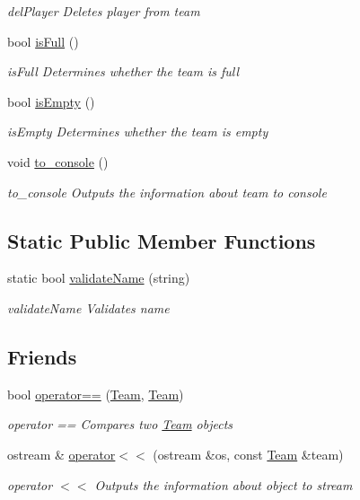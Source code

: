 \begin{DoxyCompactItemize}
\begin{DoxyCompactList}\small\item\em del\-Player Deletes player from team \end{DoxyCompactList}\item 
bool \hyperlink{class_team_a0692cba8304a16a9e7130199d98dc20e}{is\-Full} ()
\begin{DoxyCompactList}\small\item\em is\-Full Determines whether the team is full \end{DoxyCompactList}\item 
bool \hyperlink{class_team_a20b76437be05fcbe17b921cdc9972327}{is\-Empty} ()
\begin{DoxyCompactList}\small\item\em is\-Empty Determines whether the team is empty \end{DoxyCompactList}\item 
void \hyperlink{class_team_adb9b80fa6c6f6c0eed5f7500523d7860}{to\-\_\-console} ()
\begin{DoxyCompactList}\small\item\em to\-\_\-console Outputs the information about team to console \end{DoxyCompactList}\end{DoxyCompactItemize}
\subsection*{Static Public Member Functions}
\begin{DoxyCompactItemize}
\item 
static bool \hyperlink{class_team_a61e1d0f6f00634835b02168deb404ddd}{validate\-Name} (string)
\begin{DoxyCompactList}\small\item\em validate\-Name Validates name \end{DoxyCompactList}\end{DoxyCompactItemize}
\subsection*{Friends}
\begin{DoxyCompactItemize}
\item 
bool \hyperlink{class_team_a9eee662144e38bf78a062e006c8c3ceb}{operator==} (\hyperlink{class_team}{Team}, \hyperlink{class_team}{Team})
\begin{DoxyCompactList}\small\item\em operator == Compares two \hyperlink{class_team}{Team} objects \end{DoxyCompactList}\item 
ostream \& \hyperlink{class_team_a751cb895290fed5451f5af01114ca269}{operator$<$$<$} (ostream \&os, const \hyperlink{class_team}{Team} \&team)
\begin{DoxyCompactList}\small\item\em operator $<$$<$ Outputs the information about object to stream \end{DoxyCompactList}\end{DoxyCompactItemize}


